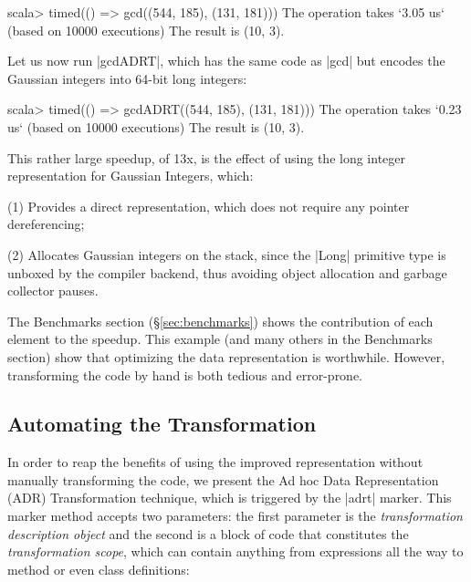 \begin{lstlisting-nobreak}
scala> timed(() => gcd((544, 185), (131, 181)))
The operation takes `3.05 us` (based on 10000 executions)
The result is (10, 3).
\end{lstlisting-nobreak}

Let us now run |gcdADRT|, which has the same code as |gcd| but encodes the Gaussian integers into 64-bit long integers:

\begin{lstlisting-nobreak}
scala> timed(() => gcdADRT((544, 185), (131, 181)))
The operation takes `0.23 us` (based on 10000 executions)
The result is (10, 3).
\end{lstlisting-nobreak}

This rather large speedup, of 13x, is the effect of using the long integer representation for Gaussian Integers, which:

\vspace{0.25em}
\begin{compactitem}
  \item[(1)] Provides a direct representation, which does not require any pointer dereferencing;
  \item[(2)] Allocates Gaussian integers on the stack, since the |Long| primitive type is unboxed by the compiler backend, thus avoiding object allocation and garbage collector pauses.
\end{compactitem}
\vspace{0.25em}

The Benchmarks section (\S\ref{sec:benchmarks}) shows the contribution of each element to the speedup. This example (and many others in the Benchmarks section) show that optimizing the data representation is worthwhile. However, transforming the code by hand is both tedious and error-prone. %

\vspace{-0.6em}

\subsection{Automating the Transformation}
\label{sec:automating}

\vspace{-0.2em}

In order to reap the benefits of using the improved representation without manually transforming the code, we present the Ad hoc Data Representation (ADR) Transformation technique, which is triggered by the |adrt| marker. This marker method accepts two parameters: the first parameter is the \emph{transformation description object} and the second is a block of code that constitutes the \emph{transformation scope}, which can contain anything from expressions all the way to method or even class definitions:

